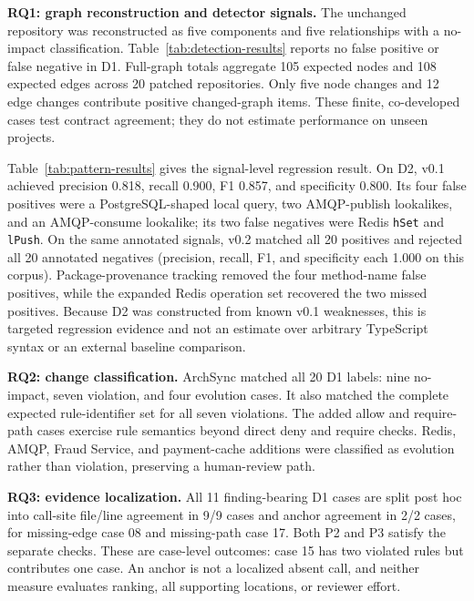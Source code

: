 \textbf{RQ1: graph reconstruction and detector signals.}
The unchanged repository was reconstructed as five components and five relationships with a no-impact classification. Table~\ref{tab:detection-results} reports no false positive or false negative in D1. Full-graph totals aggregate 105 expected nodes and 108 expected edges across 20 patched repositories. Only five node changes and 12 edge changes contribute positive changed-graph items. These finite, co-developed cases test contract agreement; they do not estimate performance on unseen projects.

Table~\ref{tab:pattern-results} gives the signal-level regression result. On D2, v0.1 achieved precision 0.818, recall 0.900, F1 0.857, and specificity 0.800. Its four false positives were a PostgreSQL-shaped local query, two AMQP-publish lookalikes, and an AMQP-consume lookalike; its two false negatives were Redis \texttt{hSet} and \texttt{lPush}. On the same annotated signals, v0.2 matched all 20 positives and rejected all 20 annotated negatives (precision, recall, F1, and specificity each 1.000 on this corpus). Package-provenance tracking removed the four method-name false positives, while the expanded Redis operation set recovered the two missed positives. Because D2 was constructed from known v0.1 weaknesses, this is targeted regression evidence and not an estimate over arbitrary TypeScript syntax or an external baseline comparison.

\textbf{RQ2: change classification.}
ArchSync matched all 20 D1 labels: nine no-impact, seven violation, and four evolution cases. It also matched the complete expected rule-identifier set for all seven violations. The added allow and require-path cases exercise rule semantics beyond direct deny and require checks. Redis, AMQP, Fraud Service, and payment-cache additions were classified as evolution rather than violation, preserving a human-review path.

\textbf{RQ3: evidence localization.}
All 11 finding-bearing D1 cases are split post hoc into call-site file/line agreement in 9/9 cases and anchor agreement in 2/2 cases, for missing-edge case 08 and missing-path case 17. Both P2 and P3 satisfy the separate checks. These are case-level outcomes: case 15 has two violated rules but contributes one case. An anchor is not a localized absent call, and neither measure evaluates ranking, all supporting locations, or reviewer effort.

